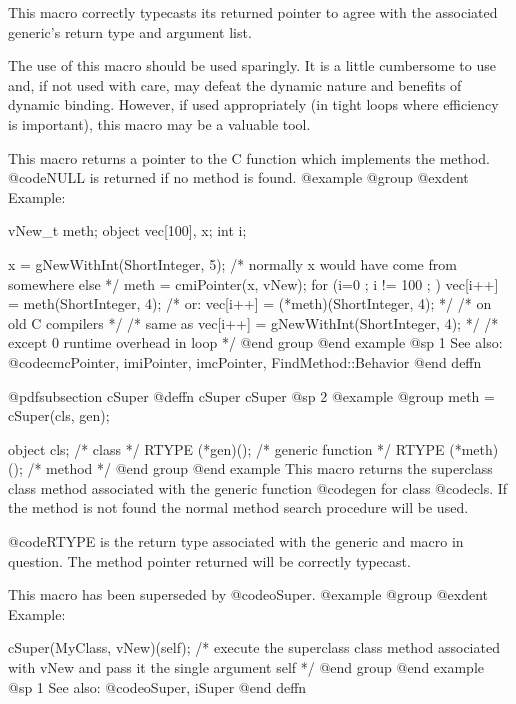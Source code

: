 {{{{This macro correctly typecasts its returned pointer to agree with
the associated generic's return type and argument list.

The use of this macro should be used sparingly.  It is a little
cumbersome to use and, if not used with care, may defeat the dynamic
nature and benefits of dynamic binding.  However, if used appropriately
(in tight loops where efficiency is important), this macro may be
a valuable tool.

This macro returns a pointer to the C function which implements the method.
@code{NULL} is returned if no method is found.
@example
@group
@exdent Example:

vNew_t    meth;
object  vec[100], x;
int     i;

x = gNewWithInt(ShortInteger, 5);
/* normally x would have come from somewhere else  */
meth = cmiPointer(x, vNew);
for (i=0 ; i != 100 ; )
        vec[i++] = meth(ShortInteger, 4);
/* or:  vec[i++] = (*meth)(ShortInteger, 4); */
         /*  on old C compilers */
/* same as vec[i++] = gNewWithInt(ShortInteger, 4);  */
/* except 0 runtime overhead in loop          */
@end group
@end example
@sp 1
See also:  @code{cmcPointer, imiPointer, imcPointer, FindMethod::Behavior}
@end deffn











@pdfsubsection {cSuper}
@deffn {cSuper} cSuper
@sp 2
@example
@group
meth = cSuper(cls, gen);

object  cls;            /*  class               */
RTYPE   (*gen)();       /*  generic function    */
RTYPE   (*meth)();      /*  method              */
@end group
@end example
This macro returns the superclass class method associated with the
generic function @code{gen} for class @code{cls}.  If the method is not
found the normal method search procedure will be used.

@code{RTYPE} is the return type associated with the generic and
macro in question.  The method pointer returned will be correctly
typecast.

This macro has been superseded by @code{oSuper}.
@example
@group
@exdent Example:

cSuper(MyClass, vNew)(self);  /* execute the superclass class
                                 method associated with vNew
                                 and pass it the single 
                                 argument self  */
@end group
@end example
@sp 1
See also:  @code{oSuper, iSuper}
@end deffn












}}}}
